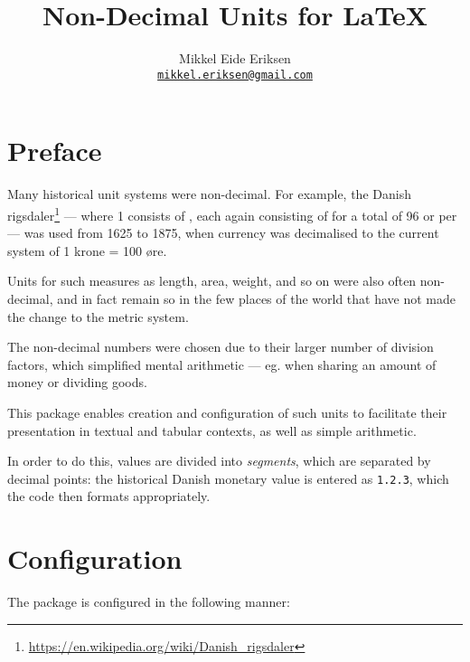 \documentclass{article}
\title{Non-Decimal Units for \LaTeX}
\author{Mikkel Eide Eriksen\\\href{mailto:mikkel.eriksen@gmail.com}{\texttt{mikkel.eriksen@gmail.com}}}
\begin{document}
\maketitle

\section{Preface} %

Many historical unit systems were non-decimal. For example, the Danish rigsdaler\footnote{\url{https://en.wikipedia.org/wiki/Danish_rigsdaler}} --- where 1  consists of  , each again consisting of   for a total of 96  or  per  --- was used from 1625 to 1875, when currency was decimalised to the current system of 1 krone = 100 øre.


Units for such measures as length, area, weight, and so on were also often non-decimal, and in fact remain so in the few places of the world that have not made the change to the metric system.

The non-decimal numbers were chosen due to their larger number of division factors, which simplified mental arithmetic --- eg. when sharing an amount of money or dividing goods.

This package enables creation and configuration of such units to facilitate their presentation in textual and tabular contexts, as well as simple arithmetic.

In order to do this, values are divided into \emph{segments}, which are separated by decimal points: the historical Danish monetary value  is entered as \texttt{1.2.3}, which the code then formats appropriately.

\clearpage
\section{Configuration} %

The package is configured in the following manner:
\end{document}
